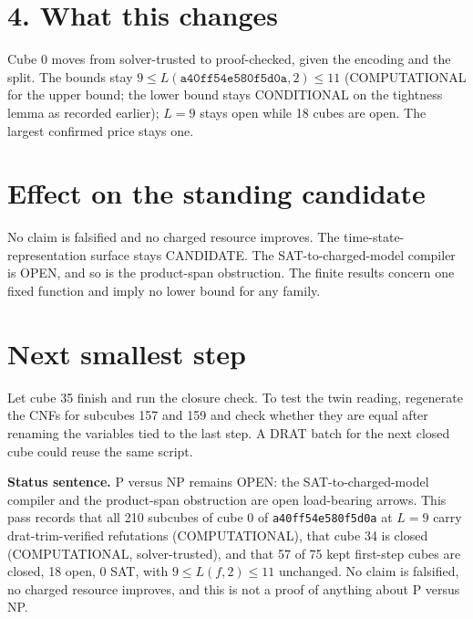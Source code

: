 \documentclass[11pt]{article}
\begin{document}
\section*{4. What this changes}
Cube 0 moves from solver-trusted to proof-checked, given the encoding and the split. The bounds stay $9\le L(\texttt{a40ff54e580f5d0a},2)\le 11$ (COMPUTATIONAL for the upper bound; the lower bound stays CONDITIONAL on the tightness lemma as recorded earlier); $L=9$ stays open while 18 cubes are open. The largest confirmed price stays one.

\section*{Effect on the standing candidate}
No claim is falsified and no charged resource improves. The time-state-representation surface stays CANDIDATE. The SAT-to-charged-model compiler is OPEN, and so is the product-span obstruction. The finite results concern one fixed function and imply no lower bound for any family.

\section*{Next smallest step}
Let cube 35 finish and run the closure check. To test the twin reading, regenerate the CNFs for subcubes 157 and 159 and check whether they are equal after renaming the variables tied to the last step. A DRAT batch for the next closed cube could reuse the same script.

\bigskip
\noindent\textbf{Status sentence.} P versus NP remains OPEN: the SAT-to-charged-model compiler and the product-span obstruction are open load-bearing arrows. This pass records that all 210 subcubes of cube 0 of \texttt{a40ff54e580f5d0a} at $L=9$ carry drat-trim-verified refutations (COMPUTATIONAL), that cube 34 is closed (COMPUTATIONAL, solver-trusted), and that 57 of 75 kept first-step cubes are closed, 18 open, 0 SAT, with $9\le L(f,2)\le 11$ unchanged. No claim is falsified, no charged resource improves, and this is not a proof of anything about P versus NP.
\end{document}
